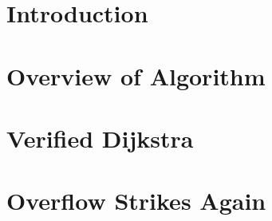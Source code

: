 \documentclass[runningheads]{llncs}
\begin{document}



\section{Introduction}
\label{sec:intro}


\section{Overview of Algorithm}
\label{sec:overview}


\section{Verified Dijkstra}
\label{sec:verification}


\section{Overflow Strikes Again}
\label{sec:overflow}






\appendix
% 


\end{document}
